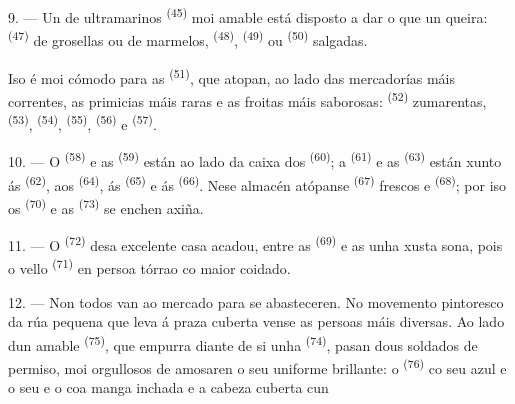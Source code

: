 9. --- Un  de ultramarinos \textsuperscript{(45)} moi amable está disposto a dar
o que un queira:  \textsuperscript{(47)} de grosellas ou de marmelos,
 \textsuperscript{(48)},  \textsuperscript{(49)} ou
 \textsuperscript{(50)} salgadas.

Iso é moi cómodo para as  \textsuperscript{(51)}, que atopan, ao lado das
mercadorías máis correntes, as primicias máis raras e as froitas máis saborosas:
 \textsuperscript{(52)} zumarentas,  \textsuperscript{(53)},
 \textsuperscript{(54)},  \textsuperscript{(55)},
 \textsuperscript{(56)} e  \textsuperscript{(57)}.

\VUsaut{4.0mm}
\VUsaut{3.0mm}

10. --- O  \textsuperscript{(58)} e as  \textsuperscript{(59)}
están ao lado da caixa dos  \textsuperscript{(60)}; a
 \textsuperscript{(61)} e as  \textsuperscript{(63)} están xunto
ás  \textsuperscript{(62)}, aos
 \textsuperscript{(64)}, ás 
\textsuperscript{(65)} e ás  \textsuperscript{(66)}. Nese almacén atópanse
 \textsuperscript{(67)} frescos e  \textsuperscript{(68)}; por iso
os  \textsuperscript{(70)} e as
 \textsuperscript{(73)} se enchen axiña.

11. --- O  \textsuperscript{(72)} desa excelente casa acadou, entre as
 \textsuperscript{(69)} e as  unha xusta sona,
pois o vello  \textsuperscript{(71)} en persoa tórrao co maior coidado.

\VUsaut{4.0mm}
\VUsaut{3.0mm}

12. --- Non todos van ao mercado para se abasteceren. No movemento pintoresco da rúa pequena
que leva á praza cuberta vense as persoas máis diversas. Ao lado dun amable
 \textsuperscript{(75)}, que empurra diante de si unha
 \textsuperscript{(74)}, pasan dous soldados de permiso, moi
orgullosos de amosaren o seu uniforme brillante: o  \textsuperscript{(76)} co
seu  azul e o seu  e o  coa
manga inchada e a cabeza cuberta cun 

